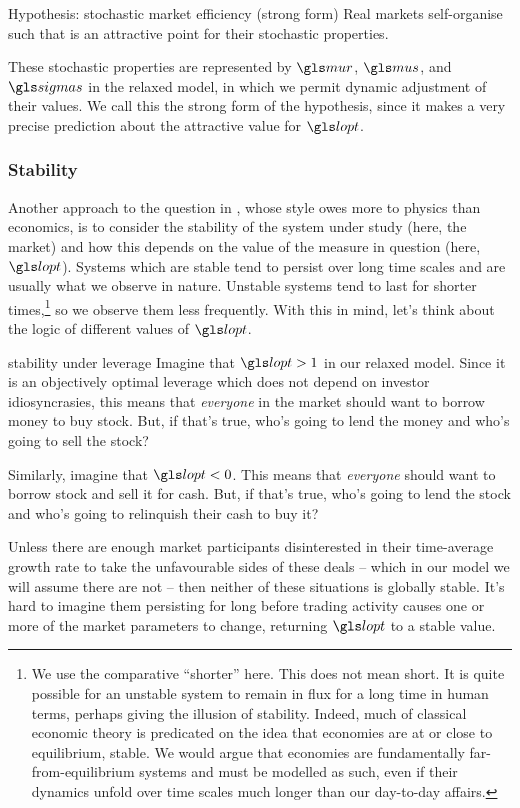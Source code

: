\begin{keypts}{Hypothesis: stochastic market efficiency (strong form)}
Real markets self-organise such that
\be
{}
\ee
is an attractive point for their stochastic properties.
\end{keypts}

These stochastic properties are represented by $\mur$, $\mus$, and $\sigmas$ in the relaxed model, in which we permit dynamic adjustment of their values. We call this the strong form of the hypothesis, since it makes a very precise prediction about the attractive value for $\lopt$.

\subsubsection{Stability}
Another approach to the question in , whose style owes more to physics than economics, is to consider the stability of the system under study (here, the market) and how this depends on the value of the measure in question (here, $\lopt$). Systems which are stable tend to persist over long time scales and are usually what we observe in nature. Unstable systems tend to last for shorter times,\footnote{We use the comparative ``shorter'' here. This does not mean short. It is quite possible for an unstable system to remain in flux for a long time in human terms, perhaps giving the illusion of stability. Indeed, much of classical economic theory is predicated on the idea that economies are at or close to equilibrium, \ie stable. We would argue that economies are fundamentally far-from-equilibrium systems and must be modelled as such, even if their dynamics unfold over time scales much longer than our day-to-day affairs.} so we observe them less frequently. With this in mind, let's think about the logic of different values of $\lopt$.

\begin{thoughtex}{stability under leverage}
Imagine that $\lopt>1$ in our relaxed model. Since it is an objectively optimal leverage which does not depend on investor idiosyncrasies, this means that \textit{everyone} in the market should want to borrow money to buy stock. But, if that's true, who's going to lend the money and who's going to sell the stock?

Similarly, imagine that $\lopt<0$. This means that \textit{everyone} should want to borrow stock and sell it for cash. But, if that's true, who's going to lend the stock and who's going to relinquish their cash to buy it?

Unless there are enough market participants disinterested in their time-average growth rate to take the unfavourable sides of these deals -- which in our model we will assume there are not -- then neither of these situations is globally stable. It's hard to imagine them persisting for long before trading activity causes one or more of the market parameters to change, returning $\lopt$ to a stable value.
\end{thoughtex}

